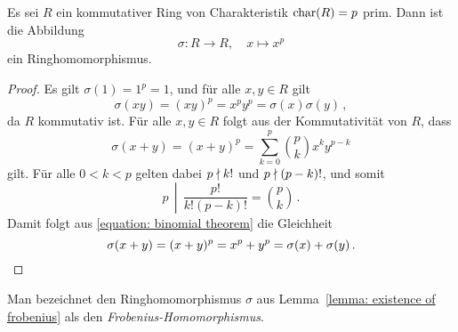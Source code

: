 \section{}





\addtocounter{subsection}{1}





\addtocounter{subsection}{1}





\addtocounter{subsection}{1}





\subsection{}

\begin{lemma}
  \label{lemma: existence of frobenius}
  Es sei $R$ ein kommutativer Ring von Charakteristik $\operatorname{char}(R) = p$ prim.
  Dann ist die Abbildung
  \[
            \sigma
    \colon  R
    \to     R,
    \quad   x
    \mapsto x^p
  \]
  ein Ringhomomorphismus.
\end{lemma}

\begin{proof}
  Es gilt $\sigma(1) = 1^p = 1$, und für alle $x, y \in R$ gilt
  \[
      \sigma(xy)
    = (xy)^p
    = x^p y^p
    = \sigma(x) \sigma(y)\,,
  \]
  da $R$ kommutativ ist.
  Für alle $x, y \in R$ folgt aus der Kommutativität von $R$, dass
  \begin{equation}
    \label{equation: binomial theorem}
      \sigma(x + y)
    = (x + y)^p
    = \sum_{k=0}^p \binom{p}{k} x^k y^{p-k}
  \end{equation}
  gilt.
  Für alle $0 < k < p$ gelten dabei $p \mathrel{\nmid} k!$ und $p \mathrel{\nmid} (p-k)!$, und somit
  \[
    \left.        p
    \,\middle|\,  \frac{p!}{k! (p-k)!} \right.
    =             \binom{p}{k}\,.
  \]
  Damit folgt aus \eqref{equation: binomial theorem} die Gleichheit
  \[
      \sigma(x + y)
    = (x + y)^p
    = x^p + y^p
    = \sigma(x) + \sigma(y)\,.
    \qedhere
  \]
\end{proof}

\begin{remark}
  Man bezeichnet den Ringhomomorphismus $\sigma$ aus Lemma~\ref{lemma: existence of frobenius} als den \emph{Frobenius-Homomorphismus}.
\end{remark}


